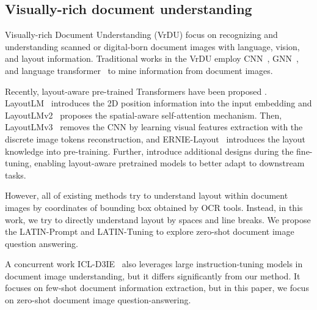 \documentclass[letterpaper]{article} \usepackage{aaai24_preprint}  \usepackage{times}  \usepackage{helvet}  \usepackage{courier}  \usepackage[hyphens]{url}  \usepackage{graphicx} \urlstyle{rm} \def\UrlFont{\rm}  \usepackage{natbib}  \usepackage{caption} \frenchspacing  \setlength{\pdfpagewidth}{8.5in} \setlength{\pdfpageheight}{11in} \usepackage{algorithm}
\begin{document}
\subsection{Visually-rich document understanding}
Visually-rich Document Understanding (VrDU) focus on recognizing and understanding scanned or digital-born document images with language, vision, and layout information.
Traditional works in the VrDU employ CNN~\cite{yangLearningExtractSemantic2017,kattiChargridUnderstanding2D2018,denkBERTgridContextualizedEmbedding2019,zhaoCUTIELearningUnderstand2019,sarkhelDeterministicRoutingLayout2019,zhangTRIEEndtoEndText2020,wangRobustVisualInformation2021,linViBERTgridJointlyTrained2021}, GNN~\cite{liuGraphConvolutionMultimodal2019,qianGraphIEGraphBasedFramework2019,yuPICKProcessingKey2020,weiRobustLayoutawareIE2020,carbonellNamedEntityRecognition2021}, and language transformer~\cite{majumderRepresentationLearningInformation2020,wangDocStruct2020} to mine information from document images.

Recently, layout-aware pre-trained Transformers have been proposed \cite{appalarajuDocFormerEndtoEndTransformer2021a,garncarekLAMBERTLayoutAwareLanguage2021a,hwangSpatialDependencyParsing2021,liStructuralLMStructuralPretraining2021,liSelfDoc2021,liStrucTexT2021,xuLayoutXLM2021,hongBROSPreTrainedLanguage2022,leeFormNetStructuralEncoding2022,pengERNIELayout2022,baiWukongReader2022,leePix2Struct2022,luoGeoLayoutLM2023,dhouibDocParserEndtoendOCRfree2023}.
LayoutLM~\cite{xuLayoutLM2020} introduces the 2D position information into the input embedding and LayoutLMv2~\cite{xuLayoutLMv22021} proposes the spatial-aware self-attention mechanism.
Then, LayoutLMv3~\cite{huangLayoutLMv32022} removes the CNN by learning visual features extraction with the discrete image tokens reconstruction, and ERNIE-Layout~\cite{pengERNIELayout2022} introduces the layout knowledge into pre-training.
Further, \cite{zhangSERA2021,guXYLayoutLM2022,wangmmLayout2022} introduce additional designs during the fine-tuning, enabling layout-aware pretrained models to better adapt to downstream tasks.

However, all of existing methods try to understand layout within document images by coordinates of bounding box obtained by OCR tools.
Instead, in this work, we try to directly understand layout by spaces and line breaks.
We propose the LATIN-Prompt and LATIN-Tuning to explore zero-shot document image question answering.

A concurrent work ICL-D3IE~\cite{heICLD3IEInContextLearning2023} also leverages large instruction-tuning models in document image understanding, but it differs significantly from our method.
It focuses on few-shot document information extraction, but in this paper, we focus on zero-shot document image question-answering.
\end{document}
